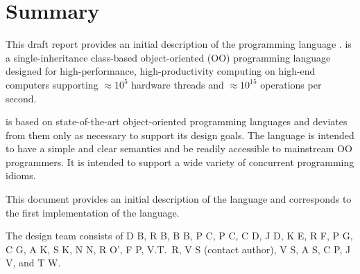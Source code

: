 
\thispagestyle{empty}




\chapter*{Summary}
This draft report provides an initial description of the programming
language \Xten. \Xten{} is a single-inheritance class-based object-oriented
(OO) programming language designed for high-performance, high-productivity
computing on high-end computers supporting $\approx 10^5$ hardware threads
and $\approx 10^{15}$ operations per second. 

{}\Xten{} is based on state-of-the-art object-oriented programming
languages and deviates from them only as necessary to support its
design goals. The language is intended to have a simple and clear
semantics and be readily accessible to mainstream OO programmers. It
is intended to support a wide variety of concurrent programming
idioms.

This document provides an initial description of the language and
corresponds to the first implementation of the language.  

The \Xten{} design team consists of
D B, 
R B, 
B B, 
P C, 
P C, 
C D, 
J D, 
K E,
R F,
P G, 
C G, 
A K, 
S K, 
N N, 
R O', 
F P, 
V.T.~R, 
V S (contact author), 
V S,
A S,  
C P,
J V, and
T W.

